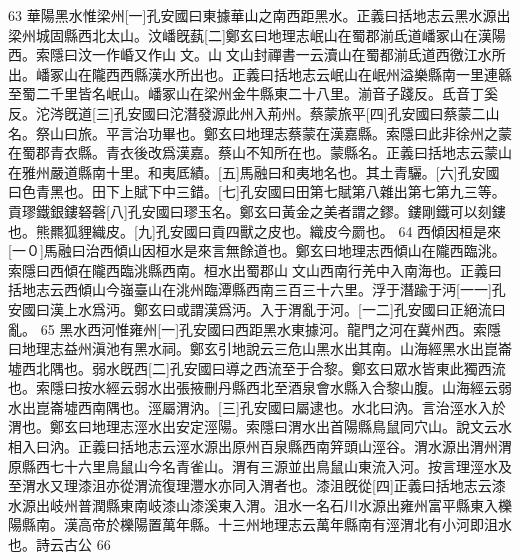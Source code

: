 63
華陽黑水惟梁州[一]孔安國曰東據華山之南西距黑水。正義曰括地志云黑水源出梁州城固縣西北太山。汶嶓旣蓺[二]鄭玄曰地理志岷山在蜀郡湔氐道嶓冢山在漢陽西。索隱曰汶一作崏又作山文。山文山封禪書一云瀆山在蜀都湔氐道西徼江水所出。嶓冢山在隴西西縣漢水所出也。正義曰括地志云岷山在岷州溢樂縣南一里連緜至蜀二千里皆名岷山。嶓冢山在梁州金牛縣東二十八里。湔音子踐反。氐音丁奚反。沱涔旣道[三]孔安國曰沱潛發源此州入荊州。蔡蒙旅平[四]孔安國曰蔡蒙二山名。祭山曰旅。平言治功畢也。鄭玄曰地理志蔡蒙在漢嘉縣。索隱曰此非徐州之蒙在蜀郡青衣縣。青衣後改爲漢嘉。蔡山不知所在也。蒙縣名。正義曰括地志云蒙山在雅州嚴道縣南十里。和夷厎績。[五]馬融曰和夷地名也。其土青驪。[六]孔安國曰色青黑也。田下上賦下中三錯。[七]孔安國曰田第七賦第八雜出第七第九三等。貢璆鐵銀鏤砮磬[八]孔安國曰璆玉名。鄭玄曰黃金之美者謂之鏐。鏤剛鐵可以刻鏤也。熊羆狐貍織皮。[九]孔安國曰貢四獸之皮也。織皮今罽也。
64
西傾因桓是來[一０]馬融曰治西傾山因桓水是來言無餘道也。鄭玄曰地理志西傾山在隴西臨洮。索隱曰西傾在隴西臨洮縣西南。桓水出蜀郡山文山西南行羌中入南海也。正義曰括地志云西傾山今嵹臺山在洮州臨潭縣西南三百三十六里。浮于潛踰于沔[一一]孔安國曰漢上水爲沔。鄭玄曰或謂漢爲沔。入于渭亂于河。[一二]孔安國曰正絕流曰亂。
65
黑水西河惟雍州[一]孔安國曰西距黑水東據河。龍門之河在冀州西。索隱曰地理志益州滇池有黑水祠。鄭玄引地說云三危山黑水出其南。山海經黑水出崑崙墟西北隅也。弱水旣西[二]孔安國曰導之西流至于合黎。鄭玄曰眾水皆東此獨西流也。索隱曰按水經云弱水出張掖刪丹縣西北至酒泉會水縣入合黎山腹。山海經云弱水出崑崙墟西南隅也。涇屬渭汭。[三]孔安國曰屬逮也。水北曰汭。言治涇水入於渭也。鄭玄曰地理志涇水出安定涇陽。索隱曰渭水出首陽縣鳥鼠同穴山。說文云水相入曰汭。正義曰括地志云涇水源出原州百泉縣西南笄頭山涇谷。渭水源出渭州渭原縣西七十六里鳥鼠山今名青雀山。渭有三源並出鳥鼠山東流入河。按言理涇水及至渭水又理漆沮亦從渭流復理灃水亦同入渭者也。漆沮旣從[四]正義曰括地志云漆水源出岐州普潤縣東南岐漆山漆溪東入渭。沮水一名石川水源出雍州富平縣東入櫟陽縣南。漢高帝於櫟陽置萬年縣。十三州地理志云萬年縣南有涇渭北有小河即沮水也。詩云古公
66
